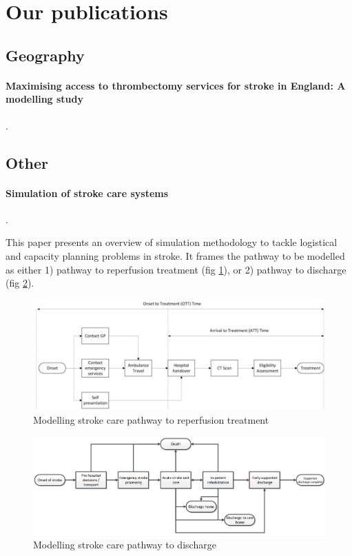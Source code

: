 \section{Our publications}

\subsection{Geography}

\paragraph{Maximising access to thrombectomy services for stroke in England: A modelling study} \cite{allen_maximising_2019}.

\subsection{Other}

\paragraph{Simulation of stroke care systems} \cite{monks_simulation_2015}. 

This paper presents an overview of simulation methodology to tackle logistical and capacity planning problems in stroke. It frames the pathway to be modelled as either 1) pathway to reperfusion treatment (fig \ref{fig:monks_hyperacute_pathway}), or 2) pathway to discharge (fig \ref{fig:monks_pathway}).

\begin{figure}
    \centering
    \includegraphics[width=0.75\linewidth]{images/monks_hyperacute_pathway.png}
    \caption{Modelling stroke care pathway to reperfusion treatment}
    \label{fig:monks_hyperacute_pathway}
\end{figure}

\begin{figure}
    \centering
    \includegraphics[width=0.75\linewidth]{images/monks_pathway.png}
    \caption{Modelling stroke care pathway to discharge}
    \label{fig:monks_pathway}
\end{figure}


